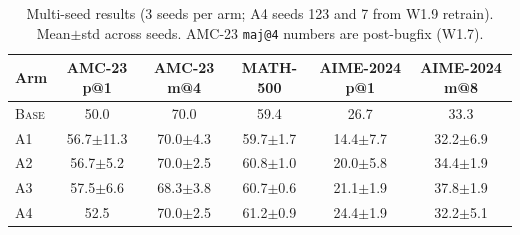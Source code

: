 \begin{table}[t]
\centering\small
\caption{Multi-seed results (3 seeds per arm; A4 seeds 123 and 7 from W1.9 retrain). Mean$\pm$std across seeds. AMC-23 \texttt{maj@4} numbers are post-bugfix (W1.7).}
\label{tab:main_v2}
\begin{tabular}{lccccc}
\toprule
Arm & AMC-23 p@1 & AMC-23 m@4 & MATH-500 & AIME-2024 p@1 & AIME-2024 m@8 \\
\midrule
\textsc{Base} & 50.0 & 70.0 & 59.4 & 26.7 & 33.3 \\
\textsc{A1} & 56.7$\pm$11.3 & 70.0$\pm$4.3 & 59.7$\pm$1.7 & 14.4$\pm$7.7 & 32.2$\pm$6.9 \\
\textsc{A2} & 56.7$\pm$5.2 & 70.0$\pm$2.5 & 60.8$\pm$1.0 & 20.0$\pm$5.8 & 34.4$\pm$1.9 \\
\textsc{A3} & 57.5$\pm$6.6 & 68.3$\pm$3.8 & 60.7$\pm$0.6 & 21.1$\pm$1.9 & 37.8$\pm$1.9 \\
\textsc{A4} & 52.5 & 70.0$\pm$2.5 & 61.2$\pm$0.9 & 24.4$\pm$1.9 & 32.2$\pm$5.1 \\
\bottomrule
\end{tabular}
\end{table}
